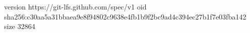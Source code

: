 version https://git-lfs.github.com/spec/v1
oid sha256:c30aa5a31bbaea9e8f94802c9638e4fb1b9f2bc9ad4c394ec27b1f7e03fba142
size 32864
